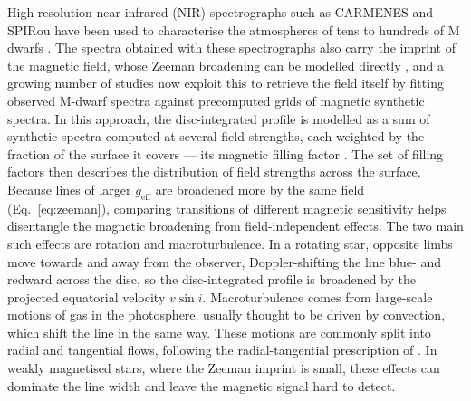 High-resolution near-infrared (NIR) spectrographs such as CARMENES \citep{Carmenes} and SPIRou \citep{spirou} have been used to characterise the atmospheres of tens to hundreds of M dwarfs \citep{Rajpurohit_2018, Passegger_2019, Marfil_2021, Sarmento_2021, Cristofari_2022a, cristofari+2022b}. The spectra obtained with these spectrographs also carry the imprint of the magnetic field, whose Zeeman broadening can be modelled directly \citep{kochukhov+2020, Petit_2021}, and a growing number of studies now exploit this to retrieve the field itself \citep{reiners+2022, cristofari_2023a, cristofari_2023b, Hahlin_2023} by fitting observed M-dwarf spectra against precomputed grids of magnetic synthetic spectra. In this approach, the disc-integrated profile is modelled as a sum of synthetic spectra computed at several field strengths, each weighted by the fraction of the surface it covers --- its magnetic filling factor \citep{Kochukhov_2021}. The set of filling factors then describes the distribution of field strengths across the surface. Because lines of larger $g_{\mathrm{eff}}$ are broadened more by the same field (Eq.~\ref{eq:zeeman}), comparing transitions of different magnetic sensitivity helps disentangle the magnetic broadening from field-independent effects. The two main such effects are rotation and macroturbulence. In a rotating star, opposite limbs move towards and away from the observer, Doppler-shifting the line blue- and redward across the disc, so the disc-integrated profile is broadened by the projected equatorial velocity $v\sin i$. Macroturbulence comes from large-scale motions of gas in the photosphere, usually thought to be driven by convection, which shift the line in the same way. These motions are commonly split into radial and tangential flows, following the radial-tangential prescription of \citet{gray+1975}. In weakly magnetised stars, where the Zeeman imprint is small, these effects can dominate the line width and leave the magnetic signal hard to detect.

